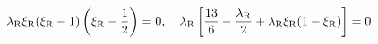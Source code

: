 \begin{equation}
   \lambda_{\rm R}\xi_{\rm R}(\xi_{\rm R}-1) \left(\xi_{\rm R}-{1 \over 2}\right)  =0 ,
  \quad 
   \lambda_{\rm R} \left[ \frac{13}6-\frac{\lambda_{\rm R}}{2} + \lambda_{\rm R}\xi_{\rm R}(1-\xi_{\rm R})\right] =0 
\end{equation}

